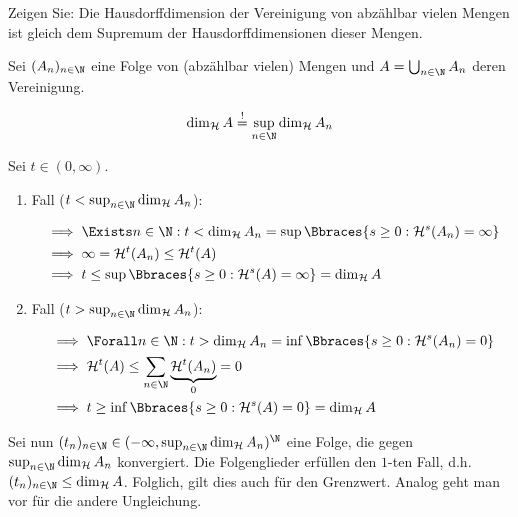 
\begin{exercise}

Zeigen Sie:
Die Hausdorffdimension der Vereinigung von abzählbar vielen Mengen ist gleich dem Supremum der Hausdorffdimensionen dieser Mengen.

\end{exercise}


\begin{solution}

Sei $(A_n)_{n \in \N}$ eine Folge von (abzählbar vielen) Mengen und $A = \bigcup_{n \in \N} A_n$ deren Vereinigung.

\begin{align*}
    \dim_\mathcal{H} A
    \stackrel{!}{=}
    \sup_{n \in \N} \dim_\mathcal{H} A_n
\end{align*}


Sei $t \in (0, \infty)$.

\begin{enumerate}[label = \arabic*.]

    \item Fall ($t < \sup_{n \in \N} \dim_\mathcal{H} A_n$):

    \begin{align*}
        & \implies
        \Exists n \in \N:
            t < \dim_\mathcal{H} A_n = \sup \Bbraces{s \geq 0: \mathcal{H}^s(A_n) = \infty} \\
        & \implies
        \infty = \mathcal{H}^t(A_n) \leq \mathcal{H}^t(A) \\
        & \implies
        t \leq \sup \Bbraces{s \geq 0: \mathcal{H}^s(A) = \infty} = \dim_\mathcal{H} A
    \end{align*}

    \item Fall ($t > \sup_{n \in \N} \dim_\mathcal{H} A_n$):
    
    \begin{align*}
        & \implies
        \Forall n \in \N:
            t > \dim_\mathcal{H} A_n = \inf \Bbraces{s \geq 0: \mathcal{H}^s(A_n) = 0} \\
        & \implies
        \mathcal{H}^t(A) \leq \sum_{n \in \N} \underbrace{\mathcal{H}^t(A_n)}_0 = 0 \\
        & \implies
        t \geq  \inf \Bbraces{s \geq 0: \mathcal{H}^s(A) = 0} = \dim_\mathcal{H} A
    \end{align*}

\end{enumerate}

Sei nun $(t_n)_{n \in \N} \in (-\infty, \sup_{n \in \N} \dim_\mathcal{H} A_n)^\N$ eine Folge, die gegen $\sup_{n \in \N} \dim_\mathcal{H} A_n$ konvergiert.
Die Folgenglieder erfüllen den $1$-ten Fall, d.h. $(t_n)_{n \in \N} \leq \dim_\mathcal{H} A$.
Folglich, gilt dies auch für den Grenzwert.
Analog geht man vor für die andere Ungleichung.

\end{solution}

